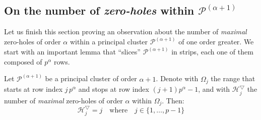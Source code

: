 
\subsection{On the number of \emph{zero-holes} within 
    $\mathcal{P}^{(\alpha+1)}$}

Let us finish this section proving an observation about the number
of \emph{maximal} zero-holes of order $\alpha$ within a principal
cluster $\mathcal{P}^{(\alpha+1)}$ of one order greater. We start with
an important lemma that ``slices'' $\mathcal{P}^{(\alpha+1)}$ in strips,
each one of them composed of $p^{\alpha}$ rows.

\begin{lemma}
    Let $\mathcal{P}^{(\alpha+1)}$ be a principal cluster of order $\alpha+1$. 
    Denote with $\Omega_{j}$ the range that starts at row index $j\,p^{\alpha}$ and stops at
    row index $(j+1)p^{\alpha} -1$, and with $\mathcal{H}_{j}^{\bigtriangledown}$ the number
    of \emph{maximal} zero-holes of order $\alpha$ within $\Omega_{j}$. 
    Then: 
    \begin{displaymath}
        \mathcal{H}_{j}^{\bigtriangledown}=j \quad\text{where}\quad j\in \lbrace 1, \ldots, p-1 \rbrace
    \end{displaymath}
\end{lemma}

